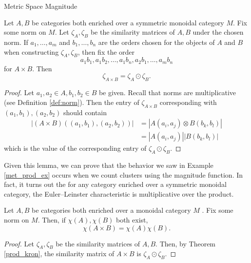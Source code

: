 \documentclass[12pt]{pom_thesis}
\newcommand{\kron}{\odot}
\begin{document}
\begin{chapter}{Metric Space Magnitude}
\begin{lemma}\label{prod_kron}
Let $A, B$ be categories both enriched over a symmetric monoidal category $M$. Fix some norm on $M$. Let $\zeta_A, \zeta_B$ be the similarity matrices of $A,B$ under the chosen norm. If $a_1,\dots,a_m$ and $b_1,\dots,b_n$ are the orders chosen for the objects of $A$ and $B$ when constructing $\zeta_A, \zeta_B$, then fix the order \[a_1b_1, a_1b_2, \dots, a_1b_n, a_2b_1, \dots, a_mb_n\] for $A \times B$. Then
\[
\zeta_{A \times B} = \zeta_A \kron \zeta_B.
\]
\end{lemma}
\begin{proof}
Let $a_1, a_2 \in A, b_1, b_2 \in B$ be given. Recall that norms are multiplicative (see Definition \ref{def:norm}). Then the entry of $\zeta_{A \times B}$ corresponding with $(a_1, b_1), (a_2, b_2)$ should contain 
\begin{align*}
|(A \times B)((a_1, b_1), (a_2, b_2))|& = |A(a_i, a_j) \otimes B(b_k, b_l)|\\
&= |A(a_i, a_j)| |B(b_k, b_l)|
\end{align*}
which is the value of the corresponding entry of $\zeta_A \kron \zeta_B$.
\end{proof}

Given this lemma, we can prove that the behavior we saw in Example \ref{met_prod_ex} occurs when we count clusters using the magnitude function. In fact, it turns out the for any category enriched over a symmetric monoidal category, the Euler--Leinster characteristic is multiplicative over the product. 

\begin{thm}
Let $A, B$ be categories both enriched over a monoidal category $M$ . Fix some norm on $M$. Then, if $\chi(A), \chi(B)$ both exist,
\[
\chi(A \times B) = \chi(A)\chi(B).
\]
\end{thm}
\begin{proof}
Let $\zeta_A, \zeta_B$ be the similarity matrices of $A,B$. Then, by Theorem \ref{prod_kron}, the similarity matrix of $A \times B$ is $\zeta_A \kron \zeta_B$. 


\end{proof}
\end{chapter}
\end{document}
